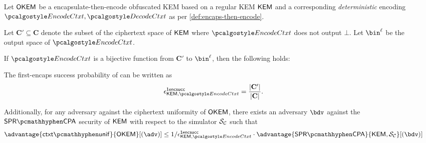 \begin{lemma}
\label{lem:ctxt-unif-for-bijections}
    Let $\mathsf{OKEM}$ be a encapsulate-then-encode obfuscated KEM based on a regular KEM $\mathsf{KEM}$ and a corresponding \emph{deterministic} encoding $\encodectxt,\decodectxt$ as per \cref{def:encaps-then-encode}.

    Let $\mathbf{C}' \subseteq \mathbf{C}$ denote the subset of the ciphertext space of $\mathsf{KEM}$ where $\encodectxt$ does not output $\bot$. Let $\bin^\ell$ be the output space of $\encodectxt$.

    If $\encodectxt$ is a bijective function from $\mathbf{C}'$ to $\bin^\ell$, then the following holds:

    The first-encaps success probability of can be written as
    \[
        \epsilon^\firstencapssuccess_{\KEM,\encodectxt} = \frac{|\mathbf{C}'|}{|\mathbf{C}|}.
    \]

    Additionally, for any adversary against the ciphertext uniformity of $\mathsf{OKEM}$, there exists an adversary $\bdv$ against the $\sprcpa$ security of $\mathsf{KEM}$ with respect to the simulator $\mathcal{S}_\mathcal{C}$ such that
    \[
        \advantage{\ctxtunif}{\OKEM}[(\adv)]
        \leq 1/\epsilon^\firstencapssuccess_{\KEM,\encodectxt}
        \cdot \advantage{\sprcpa}{\KEM, \simulunif}[(\bdv)]
    \]
\end{lemma}
